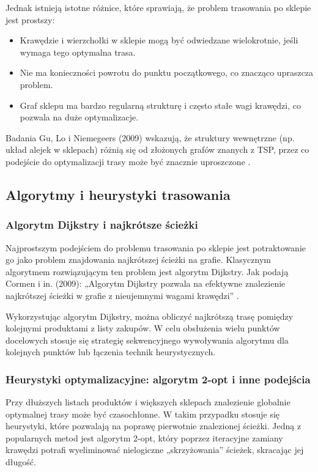 Jednak istnieją istotne różnice, które sprawiają, że problem trasowania po sklepie jest prostszy:
\begin{itemize}
    \item Krawędzie i wierzchołki w sklepie mogą być odwiedzane wielokrotnie, jeśli wymaga tego optymalna trasa.
    \item Nie ma konieczności powrotu do punktu początkowego, co znacząco upraszcza problem.
    \item Graf sklepu ma bardzo regularną strukturę i często stałe wagi krawędzi, co pozwala na duże optymalizacje.
\end{itemize}

Badania Gu, Lo i Niemegeers (2009) wskazują, że struktury wewnętrzne (np. układ alejek w sklepach) różnią się od złożonych grafów znanych z TSP, przez co podejście do optymalizacji trasy może być znacznie uproszczone \cite{Gu2009}.

\subsection{Algorytmy i heurystyki trasowania}

\subsubsection{Algorytm Dijkstry i najkrótsze ścieżki}
Najprostszym podejściem do problemu trasowania po sklepie jest potraktowanie go jako problem znajdowania najkrótszej ścieżki na grafie. Klasycznym algorytmem rozwiązującym ten problem jest algorytm Dijkstry. Jak podają Cormen i in. (2009): „Algorytm Dijkstry pozwala na efektywne znalezienie najkrótszej ścieżki w grafie z nieujemnymi wagami krawędzi” \cite{Cormen2009}.

Wykorzystując algorytm Dijkstry, można obliczyć najkrótszą trasę pomiędzy kolejnymi produktami z listy zakupów. W celu obsłużenia wielu punktów docelowych stosuje się strategię sekwencyjnego wywoływania algorytmu dla kolejnych punktów lub łączenia technik heurystycznych.

\subsubsection{Heurystyki optymalizacyjne: algorytm 2-opt i inne podejścia}
Przy dłuższych listach produktów i większych sklepach znalezienie globalnie optymalnej trasy może być czasochłonne. W takim przypadku stosuje się heurystyki, które pozwalają na poprawę pierwotnie znalezionej ścieżki. Jedną z popularnych metod jest algorytm 2-opt, który poprzez iteracyjne zamiany krawędzi potrafi wyeliminować nielogiczne „skrzyżowania” ścieżek, skracając jej długość.

